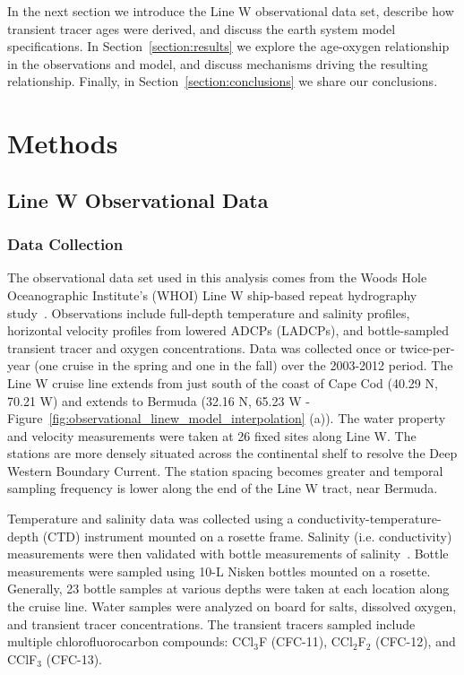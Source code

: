 In the next section we introduce the Line W observational data set, describe how
transient tracer ages were derived, and discuss the earth system model specifications.
In Section~\ref{section:results} we explore the age-oxygen relationship in the observations and model,
and discuss mechanisms driving the resulting relationship. Finally, in Section~\ref{section:conclusions}
we share our conclusions.



\section{Methods}
\label{section:methods}
\subsection{Line W Observational Data}
\subsubsection{Data Collection}
The observational data set used in this analysis comes from the Woods Hole Oceanographic
Institute's (WHOI) Line W ship-based repeat hydrography study~\citep{Andres2017}.
Observations include full-depth temperature and salinity profiles, horizontal
velocity profiles from lowered ADCPs (LADCPs), and bottle-sampled transient tracer
and oxygen concentrations.  Data was collected once or twice-per-year (one cruise
in the spring and one in the fall) over the 2003-2012 period. The Line W cruise
line extends from just south of the coast of Cape Cod (40.29 N, 70.21 W) and
extends to Bermuda (32.16 N, 65.23 W - Figure~\ref{fig:observational_linew_model_interpolation}
(a)). The water property and velocity measurements were taken at 26 fixed sites
along Line W. The stations are more densely situated across the continental shelf
to resolve the Deep Western Boundary Current. The station spacing becomes greater
and temporal sampling frequency is lower along the end of the Line W tract, near Bermuda.

Temperature and salinity data was collected using a conductivity-temperature-depth
(CTD) instrument mounted on a rosette frame. Salinity (i.e. conductivity)
measurements were then validated with bottle measurements of salinity~\citep{Millard1930}.
Bottle measurements were sampled using 10-L Nisken bottles
mounted on a rosette. Generally, 23 bottle samples at various depths were taken
at each location along the cruise line. Water samples were analyzed on board for
salts, dissolved oxygen, and transient tracer concentrations. The transient tracers
sampled include multiple chlorofluorocarbon compounds: CCl$_3$F (CFC-11), CCl$_2$F$_2$ (CFC-12),
and CClF$_3$ (CFC-13).

